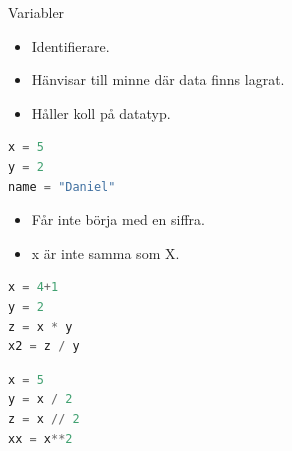 \begin{frame}[fragile]
  \begin{block}{Variabler}
    \begin{itemize}
      \item Identifierare.
      \item Hänvisar till minne där data finns lagrat.
      \item Håller koll på datatyp.
    \end{itemize}
  \end{block}

  \pause

  \begin{example}[Variabler]
    \begin{lstlisting}[language=python]
x = 5
y = 2
name = "Daniel"
    \end{lstlisting}
  \end{example}
\end{frame}

\begin{frame}
  \begin{remark}
    \begin{itemize}
      \item Får inte börja med en siffra.
      \item x är inte samma som X.
    \end{itemize}
  \end{remark}
\end{frame}

\begin{frame}[fragile]
  \begin{example}[Heltalsoperationer]
    \begin{lstlisting}[language=python]
x = 4+1
y = 2
z = x * y
x2 = z / y
    \end{lstlisting}
  \end{example}
\end{frame}

\begin{frame}[fragile]
  \begin{example}
    \begin{lstlisting}[language=python]
x = 5
y = x / 2
z = x // 2
xx = x**2
    \end{lstlisting}
  \end{example}
\end{frame}

